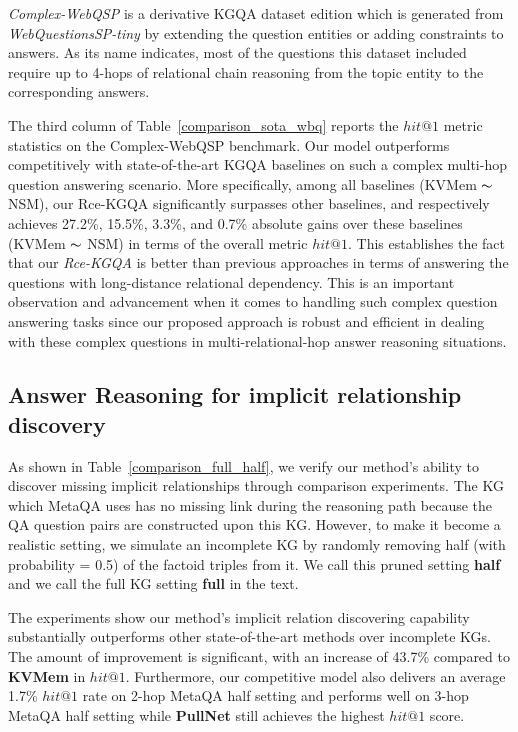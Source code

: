 \documentclass[pdflatex,sn-mathphys]{sn-jnl}%
\theoremstyle{thmstyleone}%
\theoremstyle{thmstyletwo}%
\theoremstyle{thmstylethree}%
\begin{document}
\textit{Complex-WebQSP} \cite{he2021stu-teaQA} is a derivative KGQA dataset edition which is generated from \textit{WebQuestionsSP-tiny} by extending the question entities or adding constraints to answers. As its name indicates, most of the questions this dataset included require up to 4-hops of relational chain reasoning from the topic entity to the corresponding answers.
 
The third column of Table~\ref{comparison_sota_wbq} reports the $hit@1$ metric statistics on the Complex-WebQSP benchmark. Our model outperforms competitively with state-of-the-art KGQA baselines on such a complex multi-hop question answering scenario. More specifically, among all baselines (KVMem $\thicksim$ NSM), our Rce-KGQA significantly surpasses other baselines, and respectively achieves 27.2\%, 15.5\%, 3.3\%, and 0.7\% absolute gains over these baselines (KVMem $\thicksim$ NSM) in terms of the overall metric $hit@1$. This establishes the fact that our \textit{Rce-KGQA} is better than previous approaches in terms of answering the questions with long-distance relational dependency. This is an important observation and advancement when it comes to handling such complex question answering tasks since our proposed approach is robust and efficient in dealing with these complex questions in multi-relational-hop answer reasoning situations.


\subsection{Answer Reasoning for implicit relationship discovery}

As shown in Table~\ref{comparison_full_half}, we verify our method's ability to discover missing implicit relationships through comparison experiments. The KG which MetaQA uses has no missing link during the reasoning path because the QA question pairs are constructed upon this KG. However, to make it become a realistic setting, we simulate an incomplete KG by randomly removing half (with probability = 0.5) of the factoid triples from it.  We call this pruned setting \textbf{half} and we call the full KG setting \textbf{full} in the text.  

The experiments show our method's implicit relation discovering capability substantially outperforms other state-of-the-art methods  over incomplete KGs. The amount of improvement is significant, with  an increase of 43.7\% compared to \textbf{KVMem} in $hit@1$. Furthermore, our competitive model also delivers an average 1.7\% $hit@1$ rate on 2-hop MetaQA half setting and performs well on 3-hop MetaQA half setting while \textbf{PullNet} still achieves the highest $hit@1$ score.
\end{document}
